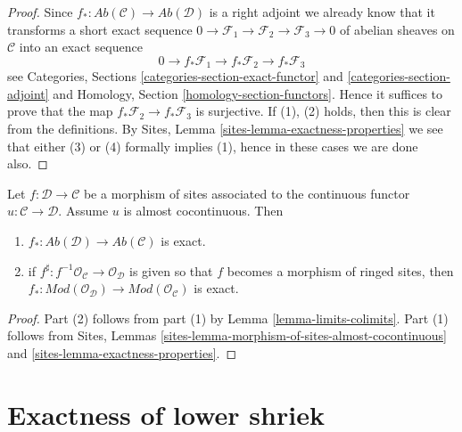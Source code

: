 \begin{proof}
Since $f_* : \textit{Ab}(\mathcal{C}) \to \textit{Ab}(\mathcal{D})$
is a right adjoint we already know that it transforms a short exact sequence
$0 \to \mathcal{F}_1 \to \mathcal{F}_2 \to \mathcal{F}_3 \to 0$
of abelian sheaves on $\mathcal{C}$ into an exact sequence
$$
0 \to f_*\mathcal{F}_1 \to f_*\mathcal{F}_2 \to f_*\mathcal{F}_3
$$
see
Categories, Sections \ref{categories-section-exact-functor} and
\ref{categories-section-adjoint}
and
Homology, Section \ref{homology-section-functors}. Hence it suffices to
prove that the map $f_*\mathcal{F}_2 \to f_*\mathcal{F}_3$ is surjective.
If (1), (2) holds, then this is clear from the definitions. By
Sites, Lemma \ref{sites-lemma-exactness-properties}
we see that either (3) or (4) formally implies (1), hence in these cases
we are done also.
\end{proof}

\begin{lemma}
\label{lemma-morphism-ringed-sites-almost-cocontinuous}
Let $f : \mathcal{D} \to \mathcal{C}$ be a morphism of sites
associated to the continuous functor $u : \mathcal{C} \to \mathcal{D}$.
Assume $u$ is almost cocontinuous. Then
\begin{enumerate}
\item $f_* : \textit{Ab}(\mathcal{D}) \to \textit{Ab}(\mathcal{C})$ is exact.
\item if $f^\sharp : f^{-1}\mathcal{O}_\mathcal{C} \to \mathcal{O}_\mathcal{D}$
is given so that $f$ becomes a morphism of ringed sites, then
$f_* : \textit{Mod}(\mathcal{O}_\mathcal{D}) \to
\textit{Mod}(\mathcal{O}_\mathcal{C})$ is exact.
\end{enumerate}
\end{lemma}

\begin{proof}
Part (2) follows from part (1) by
Lemma \ref{lemma-limits-colimits}.
Part (1) follows from
Sites, Lemmas
\ref{sites-lemma-morphism-of-sites-almost-cocontinuous} and
\ref{sites-lemma-exactness-properties}.
\end{proof}





\section{Exactness of lower shriek}
\label{section-exactness-lower-shriek}

